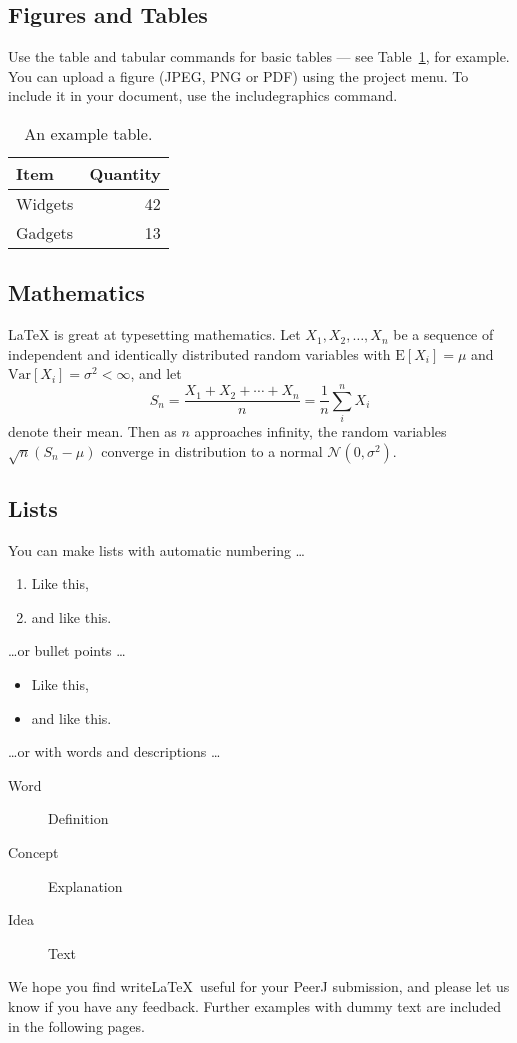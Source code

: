 \documentclass[fleqn,10pt]{wlpeerj}
\begin{document}
\subsection*{Figures and Tables}

Use the table and tabular commands for basic tables --- see Table~\ref{tab:widgets}, for example. You can upload a figure (JPEG, PNG or PDF) using the project menu. To include it in your document, use the includegraphics command.

\begin{table}[ht]
	\centering
	\begin{tabular}{l|r}
		Item & Quantity \\\hline
		Widgets & 42 \\
		Gadgets & 13
	\end{tabular}
	\caption{\label{tab:widgets}An example table.}
\end{table}


\subsection*{Mathematics}

\LaTeX{} is great at typesetting mathematics. Let $X_1, X_2, \ldots, X_n$ be a sequence of independent and identically distributed random variables with $\text{E}[X_i] = \mu$ and $\text{Var}[X_i] = \sigma^2 < \infty$, and let
$$S_n = \frac{X_1 + X_2 + \cdots + X_n}{n}
= \frac{1}{n}\sum_{i}^{n} X_i$$
denote their mean. Then as $n$ approaches infinity, the random variables $\sqrt{n}(S_n - \mu)$ converge in distribution to a normal $\mathcal{N}(0, \sigma^2)$.

\subsection*{Lists}

You can make lists with automatic numbering \dots

\begin{enumerate}[noitemsep] 
	\item Like this,
	\item and like this.
\end{enumerate}
\dots or bullet points \dots
\begin{itemize}[noitemsep] 
	\item Like this,
	\item and like this.
\end{itemize}
\dots or with words and descriptions \dots
\begin{description}
	\item[Word] Definition
	\item[Concept] Explanation
	\item[Idea] Text
\end{description}

We hope you find write\LaTeX\ useful for your PeerJ submission, and please let us know if you have any feedback. Further examples with dummy text are included in the following pages.



\end{document}
